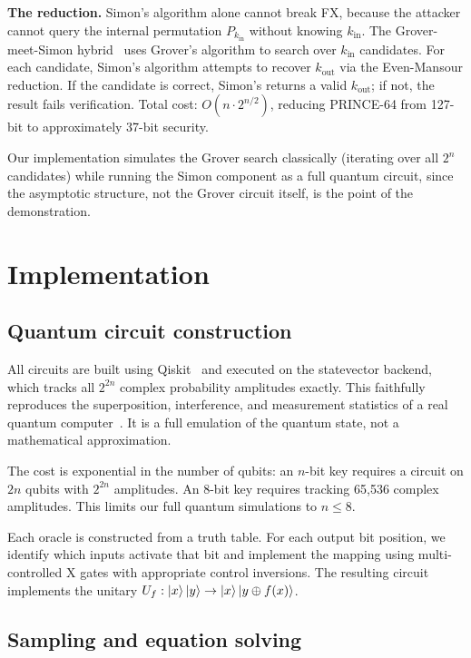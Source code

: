\documentclass[11pt]{article}
\begin{document}
\textbf{The reduction.} Simon's algorithm alone cannot break FX, because the attacker cannot query the internal permutation $P_{k_{\text{in}}}$ without knowing $k_{\text{in}}$. The Grover-meet-Simon hybrid~\cite{leander2017} uses Grover's algorithm to search over $k_{\text{in}}$ candidates. For each candidate, Simon's algorithm attempts to recover $k_{\text{out}}$ via the Even-Mansour reduction. If the candidate is correct, Simon's returns a valid $k_{\text{out}}$; if not, the result fails verification. Total cost: $O(n \cdot 2^{n/2})$, reducing PRINCE-64 from 127-bit to approximately 37-bit security.

Our implementation simulates the Grover search classically (iterating over all $2^n$ candidates) while running the Simon component as a full quantum circuit, since the asymptotic structure, not the Grover circuit itself, is the point of the demonstration.

\section{Implementation}

\subsection{Quantum circuit construction}

All circuits are built using Qiskit~\cite{qiskit2024} and executed on the statevector backend, which tracks all $2^{2n}$ complex probability amplitudes exactly. This faithfully reproduces the superposition, interference, and measurement statistics of a real quantum computer~\cite{nielsen2010}. It is a full emulation of the quantum state, not a mathematical approximation.

The cost is exponential in the number of qubits: an $n$-bit key requires a circuit on $2n$ qubits with $2^{2n}$ amplitudes. An 8-bit key requires tracking 65,536 complex amplitudes. This limits our full quantum simulations to $n \leq 8$.

Each oracle is constructed from a truth table. For each output bit position, we identify which inputs activate that bit and implement the mapping using multi-controlled X gates with appropriate control inversions. The resulting circuit implements the unitary $U_f: \ket{x}\ket{y} \to \ket{x}\ket{y \oplus f(x)}$.

\subsection{Sampling and equation solving}
\end{document}
